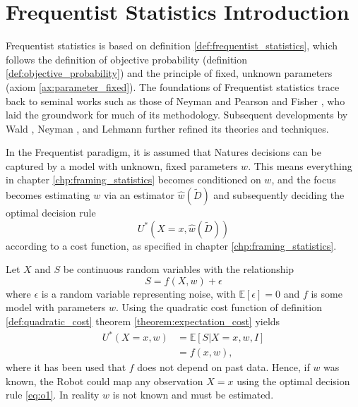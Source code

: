 \chapter{Frequentist Statistics Introduction}
\label{chp:freq}
Frequentist statistics is based on definition \ref{def:frequentist_statistics}, which follows the definition of objective probability (definition \ref{def:objective_probability}) and the principle of fixed, unknown parameters (axiom \ref{ax:parameter_fixed}). The foundations of Frequentist statistics trace back to seminal works such as those of Neyman and Pearson \citep{Neyman1928OnSR} and Fisher \citep{fisher1925statistical}, who laid the groundwork for much of its methodology. Subsequent developments by Wald \citep{Wald1945Sequential}, Neyman \citep{Neyman1948Consistent}, and Lehmann \citep{lehmann1986testing} further refined its theories and techniques.\newline

In the Frequentist paradigm, it is assumed that Natures decisions can be captured by a model with unknown, fixed parameters $w$. This means everything in chapter \ref{chp:framing_statistics} becomes conditioned on $w$, and the focus becomes estimating $w$ via an estimator $\hat{w}(\tilde{D})$ and subsequently deciding the optimal decision rule
\begin{equation}
	U^*(X=x, \hat{w}(\tilde{D}))
\end{equation}
according to a cost function, as specified in chapter \ref{chp:framing_statistics}.


\begin{example}
	Let $X$ and $S$ be continuous random variables with the relationship~\cite{hastie2001}
	\begin{equation}
		S = f(X,w)+\epsilon
	\end{equation}
	where $\epsilon$ is a random variable representing noise, with $\mathbb{E}[\epsilon]=0$ and $f$ is some model with parameters $w$. Using the quadratic cost function of definition \ref{def:quadratic_cost} theorem \eqref{theorem:expectation_cost} yields
	\begin{equation}
		\label{eq:o1}
		\begin{split}
			U^*(X = x,w) &= \mathbb{E}[S|X=x,w,I]\\
			&= f(x,w),
		\end{split}
	\end{equation}
	where it has been used that $f$ does not depend on past data. Hence, if $w$ was known, the Robot could map any observation $X=x$ using the optimal decision rule \ref{eq:o1}. In reality $w$ is not known and must be estimated.
\end{example}


